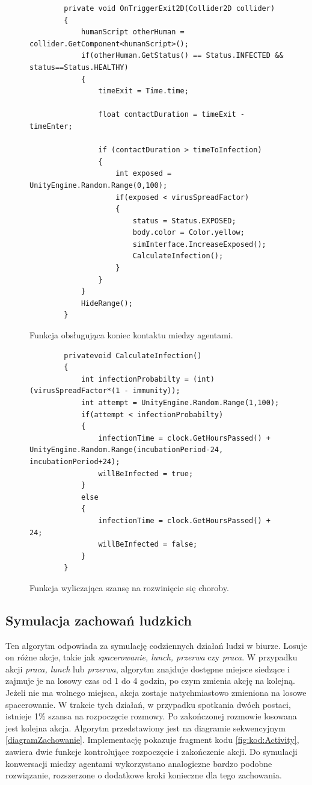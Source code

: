 \begin{figure}
	\centering
	\begin{lstlisting}
		private void OnTriggerExit2D(Collider2D collider)
		{
			humanScript otherHuman = collider.GetComponent<humanScript>();
			if(otherHuman.GetStatus() == Status.INFECTED && status==Status.HEALTHY)
			{
				timeExit = Time.time;
				
				float contactDuration = timeExit - timeEnter;
				
				if (contactDuration > timeToInfection)
				{
					int exposed = UnityEngine.Random.Range(0,100);
					if(exposed < virusSpreadFactor)
					{
						status = Status.EXPOSED;
						body.color = Color.yellow;
						simInterface.IncreaseExposed();
						CalculateInfection();
					}
				}
			}
			HideRange();
		}
	\end{lstlisting}
	\caption{Funkcja obsługująca koniec kontaktu miedzy agentami.}
	\label{fig:kod:OnTriggerExit}
\end{figure}


\begin{figure}
	\centering
	\begin{lstlisting}
	    privatevoid CalculateInfection()
		{
			int infectionProbabilty = (int)(virusSpreadFactor*(1 - immunity));
			int attempt = UnityEngine.Random.Range(1,100);
			if(attempt < infectionProbabilty)
			{
				infectionTime = clock.GetHoursPassed() + UnityEngine.Random.Range(incubationPeriod-24, incubationPeriod+24);
				willBeInfected = true;
			}
			else
			{
				infectionTime = clock.GetHoursPassed() + 24;
				willBeInfected = false;
			}
		}
	\end{lstlisting}
	\caption{Funkcja wyliczająca szansę na rozwinięcie się choroby.}
	\label{fig:kod:CalculateInfection}
\end{figure}

\subsection{Symulacja zachowań ludzkich}
Ten algorytm odpowiada za symulację codziennych działań ludzi w biurze. Losuje on różne akcje, takie jak \textit{spacerowanie, lunch, przerwa} czy \textit{praca}. W przypadku akcji \textit{praca, lunch} lub \textit{przerwa}, algorytm znajduje dostępne miejsce siedzące i zajmuje je na losowy czas od 1 do 4 godzin, po czym zmienia akcję na kolejną. Jeżeli nie ma wolnego miejsca, akcja zostaje natychmiastowo zmieniona na losowe spacerowanie. W trakcie tych działań, w przypadku spotkania dwóch postaci, istnieje 1\% szansa na rozpoczęcie rozmowy. Po zakończonej rozmowie losowana jest kolejna akcja. Algorytm przedstawiony jest na diagramie sekwencyjnym \ref{diagramZachowanie}. Implementację pokazuje fragment kodu \ref{fig:kod:Activity}, zawiera dwie funkcje kontrolujące rozpoczęcie i zakończenie akcji. Do symulacji konwersacji miedzy agentami wykorzystano analogiczne bardzo podobne rozwiązanie, rozszerzone o dodatkowe kroki konieczne dla tego zachowania.


